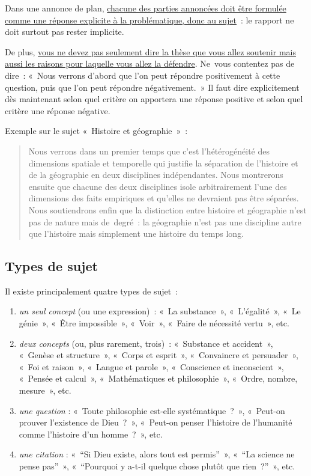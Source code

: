 \documentclass[a4paper,12pt]{article}
\begin{document}
Dans une annonce de plan, \uline{chacune des parties annoncées doit être
formulée comme une réponse explicite à la problématique, donc au
sujet} : le rapport ne doit surtout pas rester implicite. 

De plus, \uline{vous ne devez pas seulement dire la thèse que vous allez
soutenir mais aussi les raisons pour laquelle vous allez la défendre}.
Ne vous contentez pas de dire : « Nous verrons d'abord que l'on peut
répondre positivement à cette question, puis que l'on peut répondre
négativement. » Il faut dire explicitement dès maintenant selon quel
critère on apportera une réponse positive et selon quel critère une
réponse négative. 

Exemple sur le sujet « Histoire et géographie » : 
\begin{quotation}
Nous verrons dans un premier temps que c'est l'hétérogénéité des
dimensions spatiale et temporelle qui justifie la séparation de
l'histoire et de la géographie en deux disciplines indépendantes. Nous
montrerons ensuite que chacune des deux disciplines isole arbitrairement
l'une des dimensions des faits empiriques et qu'elles ne devraient pas
être séparées. Nous soutiendrons enfin que la distinction entre histoire
et géographie n'est pas de nature mais de degré : la géographie n'est
pas une discipline autre que l'histoire mais simplement une histoire du
temps long.
\end{quotation}


\subsection{Types de sujet}
\label{sec:org8b72f9f}
\label{orgba31d6c}

Il existe principalement quatre types de sujet :

\begin{enumerate}
\item \emph{un seul concept} (ou une expression) : « La substance », « L'égalité »,
« Le génie », « Être impossible », « Voir », « Faire de nécessité vertu »,
etc.

\item \emph{deux concepts} (ou, plus rarement, trois) : « Substance et
accident », « Genèse et structure », « Corps et esprit »,
« Convaincre et persuader », « Foi et raison », « Langue et parole »,
« Conscience et inconscient », « Pensée et calcul », « Mathématiques
et philosophie », « Ordre, nombre, mesure », etc.

\item \emph{une question} : « Toute philosophie est-elle systématique ? »,
« Peut-on prouver l'existence de Dieu ? », « Peut-on penser l'histoire
de l'humanité comme l'histoire d'un homme ? », etc.

\item \emph{une citation} : « ``Si Dieu existe, alors tout est permis'' »,
« ``La science ne pense pas'' », « ``Pourquoi y a-t-il quelque chose
plutôt que rien ?'' », etc.
\end{enumerate}
\end{document}
